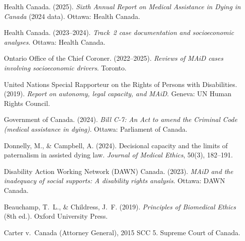 \documentclass[11pt, letterpaper]{article}
\begin{document}
\begin{flushleft}
\setlength{\parindent}{0pt}
\setlength{\parskip}{6pt}

Health Canada. (2025). \textit{Sixth Annual Report on Medical Assistance in Dying in
Canada} (2024 data). Ottawa: Health Canada.

\medskip
Health Canada. (2023--2024). \textit{Track~2 case documentation and socioeconomic
analyses}. Ottawa: Health Canada.

\medskip
Ontario Office of the Chief Coroner. (2022--2025). \textit{Reviews of MAiD cases
involving socioeconomic drivers}. Toronto.

\medskip
United Nations Special Rapporteur on the Rights of Persons with Disabilities. (2019).
\textit{Report on autonomy, legal capacity, and MAiD}. Geneva: UN Human Rights Council.

\medskip
Government of Canada. (2024). \textit{Bill C-7: An Act to amend the Criminal Code
(medical assistance in dying)}. Ottawa: Parliament of Canada.

\medskip
Donnelly, M., \& Campbell, A. (2024). Decisional capacity and the limits of
paternalism in assisted dying law. \textit{Journal of Medical Ethics}, 50(3), 182--191.

\medskip
Disability Action Working Network (DAWN) Canada. (2023). \textit{MAiD and the
inadequacy of social supports: A disability rights analysis}. Ottawa: DAWN Canada.

\medskip
Beauchamp, T.~L., \& Childress, J.~F. (2019). \textit{Principles of Biomedical
Ethics} (8th ed.). Oxford University Press.

\medskip
Carter v.\ Canada (Attorney General), 2015 SCC 5. Supreme Court of Canada.

\end{flushleft}

\end{document}
